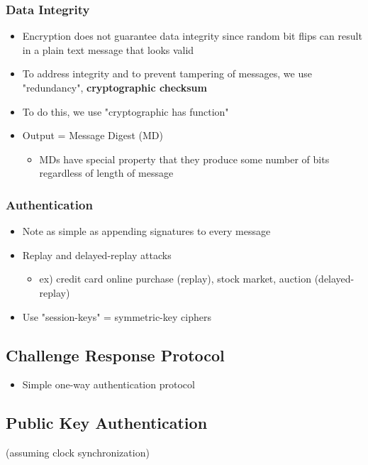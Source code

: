 \documentclass[11pt]{article}
\begin{document}
\subsubsection{Data Integrity}
\label{sec:orgheadline159}
\begin{itemize}
\item Encryption does not guarantee data integrity since random bit flips
can result in a plain text message that looks valid
\item To address integrity and to prevent tampering of messages, we use
"redundancy", \textbf{cryptographic checksum}
\item To do this, we use "cryptographic has function"
\item Output = Message Digest (MD)
\begin{itemize}
\item MDs have special property that they produce some number of bits
regardless of length of message
\end{itemize}
\end{itemize}

\subsubsection{Authentication}
\label{sec:orgheadline160}
\begin{itemize}
\item Note as simple as appending signatures to every message
\item Replay and delayed-replay attacks
\begin{itemize}
\item ex) credit card online purchase (replay), stock market, auction
(delayed-replay)
\end{itemize}
\item Use "session-keys" = symmetric-key ciphers
\end{itemize}

\subsection{Challenge Response Protocol}
\label{sec:orgheadline162}
\begin{itemize}
\item Simple one-way authentication protocol
\end{itemize}

\subsection{Public Key Authentication}
\label{sec:orgheadline165}
(assuming clock synchronization)
\end{document}
